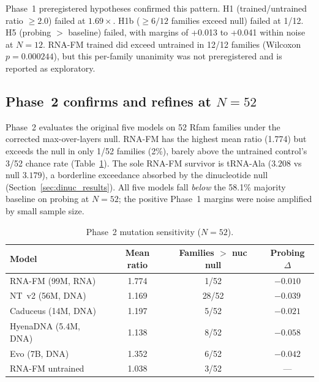 \documentclass[11pt]{article}
\begin{document}
Phase~1 preregistered hypotheses confirmed this pattern.  H1 (trained/untrained
ratio $\geq 2.0$) failed at $1.69\times$.  H1b ($\geq 6/12$ families
exceed null) failed at 1/12.  H5 (probing $>$ baseline) failed, with
margins of +0.013 to +0.041 within noise at $N = 12$.  RNA-FM trained
did exceed untrained in 12/12 families (Wilcoxon $p = 0.000244$), but
this per-family unanimity was not preregistered and is reported as
exploratory.

\subsection{Phase~2 confirms and refines at $N = 52$}
\label{sec:phase2}

Phase~2 evaluates the original five models on 52 Rfam families under
the corrected max-over-layers null.  RNA-FM has the highest mean ratio
(1.774) but exceeds the null in only 1/52 families (2\%), barely above
the untrained control's 3/52 chance rate
(Table~\ref{tab:phase2_summary}).  The sole RNA-FM survivor is
tRNA-Ala ($3.208$ vs null $3.179$), a borderline exceedance absorbed
by the dinucleotide null (Section~\ref{sec:dinuc_results}).  All five
models fall \emph{below} the 58.1\% majority baseline on probing at
$N = 52$; the positive Phase~1 margins were noise amplified by small
sample size.

\begin{table}[t]
\centering
\caption{Phase~2 mutation sensitivity ($N = 52$).}
\label{tab:phase2_summary}
\begin{tabular}{@{}lccc@{}}
\toprule
\textbf{Model} & \textbf{Mean ratio} &
  \textbf{Families $>$ nuc null} & \textbf{Probing $\Delta$} \\
\midrule
RNA-FM (99M, RNA)         & 1.774 & 1/52  & $-0.010$ \\
NT~v2 (56M, DNA)          & 1.169 & 28/52 & $-0.039$ \\
Caduceus (14M, DNA)       & 1.197 & 5/52  & $-0.021$ \\
HyenaDNA (5.4M, DNA)      & 1.138 & 8/52  & $-0.058$ \\
Evo (7B, DNA)             & 1.352 & 6/52  & $-0.042$ \\
RNA-FM untrained          & 1.038 & 3/52  & --- \\
\bottomrule
\end{tabular}
\end{table}
\end{document}
